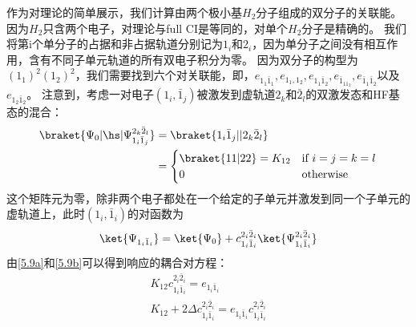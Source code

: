 作为对理论的简单展示，我们计算由两个极小基$H_2$分子组成的双分子的关联能。因为$H_2$只含两个电子，对理论与full CI是等同的，对单个$H_2$分子是精确的。
我们将第i个单分子的占据和非占据轨道分别记为$1_i$和$2_i$，因为单分子之间没有相互作用，含有不同子单元轨道的所有双电子积分为零。
因为双分子的构型为$(1_1)^2(1_2)^2$，我们需要找到六个对关联能，即，$e_{1_1\bar{1}_1}, e_{1_1,1_2}, e_{1_1\bar{1}_2}, e_{\bar{1}_11_2}, e_{\bar{1}_1\bar{1}_2}$以及$e_{1_2\bar{1}_2}$。
注意到，考虑一对电子$(1_i,\bar{1}_j)$被激发到虚轨道$2_k$和$\bar{2}_l$的双激发态和HF基态的混合：
\begin{align}
    \braket{\Psi_0|\hs|\Psi^{2_k\bar{2}_l}_{1_i\bar{1}_j}}&=\braket{1_i\bar{1}_j||2_k\bar{2}_l}\notag\\
    &=\begin{cases}
        \braket{11|22}=K_{12} & \text{if } i=j=k=l\\
        0 & \text{otherwise}
    \end{cases}
\end{align}
这个矩阵元为零，除非两个电子都处在一个给定的子单元并激发到同一个子单元的虚轨道上，此时$(1_i,\bar{1}_i)$的对函数为
\begin{align}
    \ket{\Psi_{1_i\bar{1}_i}}=\ket{\Psi_0}+c_{1_i\bar{1}_i}^{2_i\bar{2}_i}\ket{\Psi_{1_i\bar{1}_i}^{2_i\bar{2}_i}}
\end{align}
由\autoref{5.9a}和\autoref{5.9b}可以得到响应的耦合对方程：
\begin{subequations}
    \begin{align}
        K_{12}c_{1_i\bar{1}_i}^{2_i\bar{2}_i}=e_{1_i\bar{1}_i}\tag{5.22a}\label{5.22a}\\
        K_{12}+2\Delta c_{1_i\bar{1}_i}^{2_i\bar{2}_i}=e_{1_i\bar{1}_i} c_{1_i\bar{1}_i}^{2_i\bar{2}_i}\tag{5.22b}\label{5.22b}
    \end{align}
\end{subequations}
